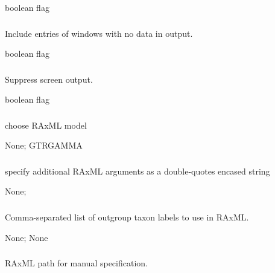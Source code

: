 \documentclass[letterpaper,11pt,english]{sphinxmanual}
\begin{document}
 boolean flag


\subsubsection{}
\label{\detokenize{prog_desc:output-empty-outputempty}}
 Include entries of windows with no data in output.

 boolean flag


\subsubsection{}
\label{\detokenize{prog_desc:id111}}
 Suppress screen output.

 boolean flag


\subsubsection{}
\label{\detokenize{prog_desc:raxml-model-raxmlmodel}}
 choose RAxML model

 None;  GTRGAMMA


\subsubsection{}
\label{\detokenize{prog_desc:raxml-opts-raxmlopts}}
 specify additional RAxML arguments as a double-quotes encased string

 None; 


\subsubsection{}
\label{\detokenize{prog_desc:raxml-outgroups-raxmloutgroups}}
 Comma-separated list of outgroup taxon labels to use in RAxML.

 None;  None


\subsubsection{}
\label{\detokenize{prog_desc:id112}}
 RAxML path for manual specification.
\end{document}
